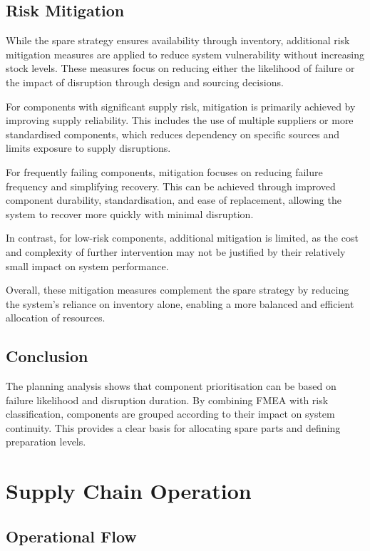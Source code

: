 \subsection{Risk Mitigation}

While the spare strategy ensures availability through inventory, additional risk mitigation measures are applied to reduce system vulnerability without increasing stock levels. These measures focus on reducing either the likelihood of failure or the impact of disruption through design and sourcing decisions.

For components with significant supply risk, mitigation is primarily achieved by improving supply reliability. This includes the use of multiple suppliers or more standardised components, which reduces dependency on specific sources and limits exposure to supply disruptions.

For frequently failing components, mitigation focuses on reducing failure frequency and simplifying recovery. This can be achieved through improved component durability, standardisation, and ease of replacement, allowing the system to recover more quickly with minimal disruption.

In contrast, for low-risk components, additional mitigation is limited, as the cost and complexity of further intervention may not be justified by their relatively small impact on system performance.

Overall, these mitigation measures complement the spare strategy by reducing the system’s reliance on inventory alone, enabling a more balanced and efficient allocation of resources.

\subsection{Conclusion}

The planning analysis shows that component prioritisation can be based on failure likelihood and disruption duration. By combining FMEA with risk classification, components are grouped according to their impact on system continuity. This provides a clear basis for allocating spare parts and defining preparation levels.

\section{Supply Chain Operation}

\subsection{Operational Flow}

